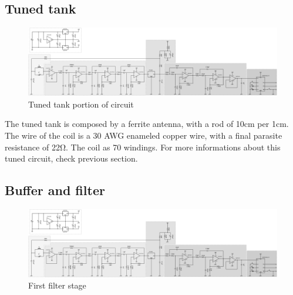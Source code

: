 \subsection{Tuned tank}
\begin{figure}[h]
	\centering
	\includegraphics*[viewport=3 3 240 457,scale=0.4]{ch2/img/receiver3.pdf}
	\caption{Tuned tank portion of circuit}
	\label{fig:tunedtank}
\end{figure}

The tuned tank is composed by a ferrite antenna, with a rod of \num{10}\si{\centi\meter} per \diameter \num{1}\si{\centi\meter}. The wire of the coil is a \num{30} AWG enameled copper wire, with a final parasite resistance of \num{22}\si{\ohm}. The coil as \num{70} windings. For more informations about this tuned circuit, check previous section.

\subsection{Buffer and filter}
\begin{figure}[h]
	\centering
	\includegraphics*[viewport=170 3 1250 380,scale=0.4]{ch2/img/receiver3.pdf}
	\caption{First filter stage}
	\label{fig:filter1}
\end{figure}

